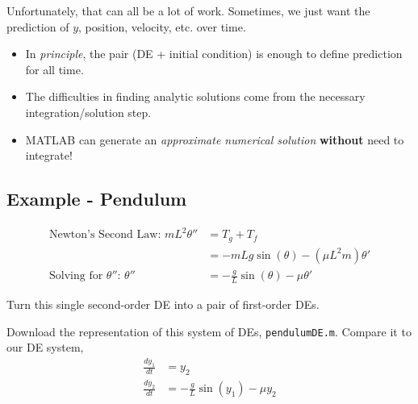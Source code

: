 

\newpage

Unfortunately, that can all be a lot of work.  Sometimes, we just want
the prediction of $y$, position, velocity, etc. over time.
\begin{itemize}
\item In {\em principle}, the pair (DE + initial condition) is enough
  to define prediction for all time.
\item The difficulties in finding analytic solutions come from the
  necessary integration/solution step.
\item MATLAB can generate an {\em approximate numerical solution} {\bf
    without} need to integrate!
\end{itemize}

\vfill


\newpage

\subsection*{Example - Pendulum }
\vfill
\begin{align*}
  \mbox{Newton's Second Law: }   m  L^2 \theta'' & = T_g + T_f  \\
  & = - m L g \sin(\theta) - (\mu L^2 m) \theta' \\
  \mbox{Solving for $\theta''$: }\theta'' & = - \frac{g}{L} \sin(\theta) - \mu 
  \theta'
\end{align*}

\problem Turn this single second-order DE into a pair of first-order
DEs.

\newpage


\problem Download the representation of this system of DEs,
  \texttt{pendulumDE.m}.  Compare it to our DE system,
\begin{align*}
\frac{d y_1}{dt} & = y_2 \\
\frac{d y_2}{dt} & = -\frac{g}{L}\sin(y_1)  - \mu y_2
\end{align*}
\vsc

